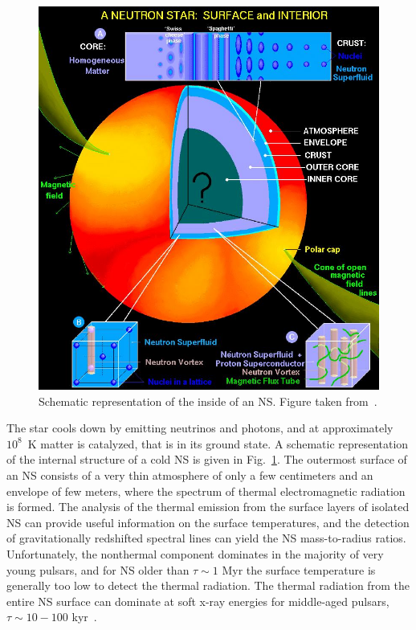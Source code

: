\begin{figure}[!t]
\begin{center}
  \includegraphics[width=0.8\linewidth]{figures/NStarInt.jpeg}
\end{center}
\caption[Schematic representation of the inside of a neutron star]{Schematic
representation of the inside of an NS. Figure taken 
from~\cite{Page2006}.}\label{fig:NStarInt}
\end{figure}
% 
The star cools down by emitting neutrinos and photons, and at approximately
$10^8$~K matter is catalyzed, that is in its ground state.
A schematic representation of the internal structure of a cold NS is given in
Fig.~\ref{fig:NStarInt}.
The outermost surface of an NS consists of a very thin atmosphere of 
only a few centimeters and an envelope of few meters, where the spectrum of
thermal electromagnetic radiation is formed. {The analysis of the thermal 
  emission from the surface layers of isolated NS can provide useful 
  information on the surface temperatures, and the detection of gravitationally 
  redshifted spectral lines can yield the NS mass-to-radius ratios.
  Unfortunately, the nonthermal component dominates in the majority of very 
  young pulsars, and for NS older than $\tau \sim 1$ Myr the surface 
  temperature is generally too low to detect the thermal radiation. The thermal 
  radiation from the entire NS surface can dominate at soft x-ray energies for 
  middle-aged pulsars, $\tau \sim 10 - 100$ kyr~\cite{Haensel2007}.} 

